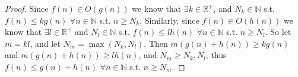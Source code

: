 \documentclass[10pt,oneside,reqno]{amsart}
\theoremstyle{plain}
\theoremstyle{definition}
\begin{document}
\begin{enumerate}[label=\arabic*.]
\begin{proof}
Since $f(n) \in O(g(n))$ we know that $\exists k \in \mathbb{R}^+$,  and $N_k \in \mathbb{N}$ s.t. $f(n) \leq kg(n)$ $\forall n \in \mathbb{N}$ s.t. $n \geq N_k$. Similarly, since $f(n) \in O(h(n))$ we know that $\exists l \in \mathbb{R}^+$ and $N_l \in \mathbb{N}$ s.t. $f(n) \leq lh(n)$ $\forall n \in \mathbb{N}$ s.t. $n \geq N_l$.  So let $m = kl$, and let $N_m = \max{(N_k,N_l)}$. Then $m(g(n) + h(n)) \geq kg(n)$ and $m(g(n) + h(n)) \geq lh(n)$, and $N_m \geq N_k,N_l$, thus $f(n) \leq g(n) + h(n)$ $\forall n \in \mathbb{N}$ s.t. $n \geq N_m$. 
\end{proof}




\end{enumerate}
\end{document}

